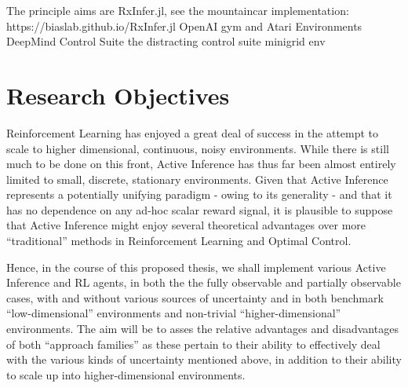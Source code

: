 
The principle aims are 
RxInfer.jl, see the mountaincar implementation: https://biaslab.github.io/RxInfer.jl
OpenAI gym and Atari Environments
DeepMind Control Suite \textcite{Deep-Mind-Control-Suite}
the distracting control suite 
minigrid env \textcite{minigrid}



\section{Research Objectives}
Reinforcement Learning has enjoyed a great deal of success in the attempt to scale to higher dimensional, continuous, noisy environments. While there is still much to be done on this front, Active Inference has thus far been almost entirely limited to small, discrete, stationary environments. Given that Active Inference represents a potentially unifying paradigm - owing to its generality - and that it has no dependence on any ad-hoc scalar reward signal, it is plausible to suppose that Active Inference might enjoy several theoretical advantages over more ``traditional'' methods in Reinforcement Learning and Optimal Control. 

Hence, in the course of this proposed thesis, we shall implement various Active Inference and RL agents, in both the the fully observable and partially observable cases, with and without various sources of uncertainty and in both benchmark ``low-dimensional'' environments and non-trivial ``higher-dimensional'' environments. The aim will be to asses the relative advantages and disadvantages of both ``approach families'' as these pertain to their ability to effectively deal with the various kinds of uncertainty mentioned above, in addition to their ability to scale up into higher-dimensional environments.     
